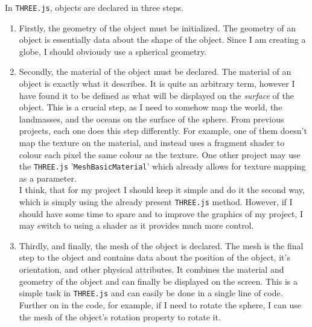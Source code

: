 In \verb|THREE.js|, objects are declared in three steps.
\begin{enumerate}
\item Firstly, the geometry of the object must be initialized. The geometry of an object is essentially data about the shape of the object. Since I am creating a globe, I should obviously use a spherical geometry.

\item Secondly, the material of the object must be declared. The material of an object is exactly what it describes. It is quite an arbitrary term, however I have found it to be defined as what will be displayed on the \textit{surface} of the object. This is a crucial step, as I need to somehow map the world, the landmasses, and the oceans on the surface of the sphere. From previous projects, each one does this step differently. For example, one of them doesn't map the texture on the material, and instead uses a fragment shader to colour each pixel the same colour as the texture. One other project may use the \verb|THREE.js| '\verb|MeshBasicMaterial|' which already allows for texture mapping as a parameter. \\
I think, that for my project I should keep it simple and do it the second way, which is simply using the already present \verb|THREE.js| method. However, if I should have some time to spare and to improve the graphics of my project, I may switch to using a shader as it provides much more control.

\item Thirdly, and finally, the mesh of the object is declared. The mesh is the final step to the object and contains data about the position of the object, it's orientation, and other physical attributes. It combines the material and geometry of the object and can finally be displayed on the screen. This is a simple task in \verb|THREE.js| and can easily be done in a single line of code. Further on in the code, for example, if I need to rotate the sphere, I can use the mesh of the object's rotation property to rotate it.
\end{enumerate}

